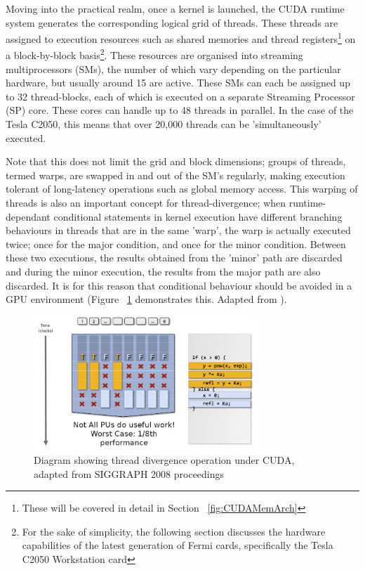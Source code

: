 Moving into the practical realm, once a kernel is launched, the CUDA runtime system generates the corresponding logical grid of threads. These threads are assigned to execution resources such as shared memories and thread registers\footnote{These will be covered in detail in Section ~\ref{fig:CUDAMemArch}} on a block-by-block basis\footnote{For the sake of simplicity, the following section discusses the hardware capabilities of the latest generation of Fermi cards, specifically the Tesla C2050 Workstation card}. These resources are organised into streaming multiprocessors (SMs), the number of which vary depending on the particular hardware, but usually around 15 are active. These SMs can each be assigned up to 32 thread-blocks, each of which is executed on a separate Streaming Processor (SP) core. These cores can handle up to 48 threads in parallel. In the case of the Tesla C2050, this means that over 20,000 threads can be 'simultaneously' executed.

Note that this does not limit the grid and block dimensions; groups of threads, termed warps, are swapped in and out of the SM's regularly, making execution tolerant of long-latency operations such as global memory access. This warping of threads is also an important concept for thread-divergence; when runtime-dependant conditional statements in kernel execution have different branching behaviours in threads that are in the same 'warp', the warp is actually executed twice; once for the major condition, and once for the minor condition. Between these two executions, the results obtained from the 'minor' path are discarded and during the minor execution, the results from the major path are also discarded. It is for this reason that conditional behaviour should be avoided in a GPU environment (Figure ~\ref{fig:thread-divergence} demonstrates this. Adapted from \cite{KF08}). 

\begin{figure}[h!]
  \centering
  \includegraphics[width=0.75\textwidth,keepaspectratio=true]{images/thread_divergence.png}
  \caption{Diagram showing thread divergence operation under CUDA, adapted from SIGGRAPH 2008 proceedings}
  \label{fig:thread-divergence}
\end{figure}

